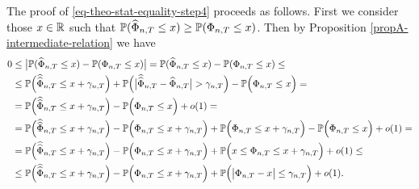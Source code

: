\documentclass[a4paper,12pt]{article}
\newcommand{\doublehattwo}[1]{\widehat{\widehat{#1}}}
\begin{document}
The proof of \eqref{eq-theo-stat-equality-step4} proceeds as follows. First we consider those $x\in \mathbb{R}$ such that $\mathbb{P}(\widehat{\Phi}_{n,T} \le x) \geq \mathbb{P}(\Phi_{n, T} \le x)$. Then by Proposition \ref{propA-intermediate-relation} we have
\begin{align}\label{eq-theo-stat-equality-step3}
0 &\le \big| \pr(\widehat{\Phi}_{n, T} \le x) - \pr(\Phi_{n,T} \le x) \big| = \pr(\widehat{\Phi}_{n, T} \le x) - \pr(\Phi_{n,T} \le x)  \le \nonumber\\
&\le \pr\Big(\doublehattwo{\Phi}_{n,T} \le x + \gamma_{n, T}\Big) + \pr \Big(\big|\doublehattwo{\Phi}_{n,T} - \widehat{\Phi}_{n,T}\big| > \gamma_{n, T} \Big)   - \pr\Big(\Phi_{n,T} \le x\Big) = \nonumber\\
&= \pr\Big(\doublehattwo{\Phi}_{n,T} \le x + \gamma_{n, T}\Big)  - \pr\Big(\Phi_{n,T} \le x\Big) + o(1)= \nonumber\\
&= \pr\Big(\doublehattwo{\Phi}_{n,T} \le x + \gamma_{n, T}\Big) - \pr\Big({\Phi}_{n,T} \le x + \gamma_{n, T}\Big) +  \pr\Big({\Phi}_{n,T} \le x + \gamma_{n, T}\Big)   - \pr\Big(\Phi_{n,T} \le x\Big) + o(1)= \nonumber \\
&= \pr\Big(\doublehattwo{\Phi}_{n,T} \le x + \gamma_{n, T}\Big) - \pr\Big({\Phi}_{n,T} \le x + \gamma_{n, T}\Big) +  \pr\Big(x \le {\Phi}_{n,T} \le x + \gamma_{n, T}\Big) + o(1)\le \nonumber \\
&\le \pr\Big(\doublehattwo{\Phi}_{n,T} \le x + \gamma_{n, T}\Big) - \pr\Big({\Phi}_{n,T} \le x + \gamma_{n, T}\Big) +  \pr\Big(\big|{\Phi}_{n,T} - x \big| \le \gamma_{n, T}\Big) + o(1).
\end{align}
\end{document}
